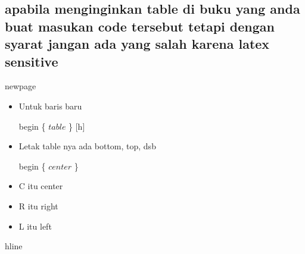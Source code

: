 \vspace{\baselineskip}
\subsection{apabila menginginkan table di buku yang anda buat masukan code tersebut tetapi dengan syarat jangan ada yang salah karena latex sensitive}


\noindent newpage\par
\vspace{\baselineskip}

\begin{itemize}
	\item Untuk baris baru\par

\vspace{\baselineskip}
begin \{ $table$ \} [h]\par

	\item Letak table nya ada bottom, top, dsb\par

\vspace{\baselineskip}
begin \{ $center$ \} \par

\vspace{\baselineskip}
	\item C itu center\par
\vspace{\baselineskip}
	\item R itu right\par
\vspace{\baselineskip}
	\item L itu left
\end{itemize}\par

\vspace{\baselineskip}
\vspace{\baselineskip}
\noindent hline\par

